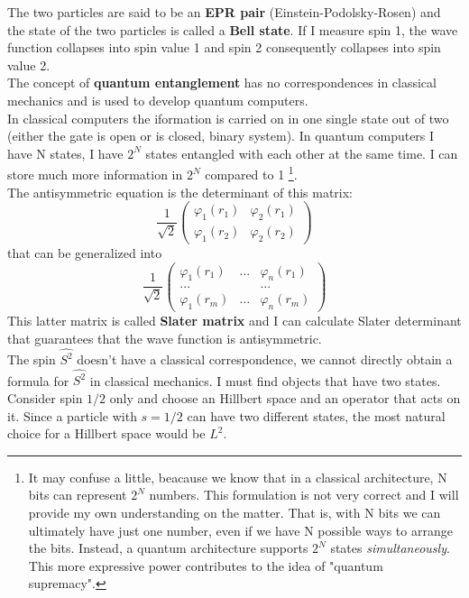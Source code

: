 The two particles are said to be an \textbf{EPR pair} (Einstein-Podolsky-Rosen) and the state of the two particles is called a \textbf{Bell state}.
If I measure spin 1, the wave function collapses into spin value 1 and spin 2 consequently collapses into spin value 2.\\
The concept of \textbf{quantum entanglement} has no correspondences in classical mechanics and is used to develop quantum computers.\\
In classical computers the iformation is carried on in one single state out of two (either the gate is open or is closed, binary system). In quantum computers I have N states, I have $2^N$ states entangled with each other at the same time. I can store much more information in $2^N$ compared to 1 \footnote{It may confuse a little, beacause we know that in a classical architecture, N bits can represent $2^N$ numbers. This formulation is not very correct and I will provide my own understanding on the matter. That is, with N bits we can ultimately have just one number, even if we have N possible ways to arrange the bits. Instead, a quantum architecture supports $2^N$ states \textit{simultaneously}. This more expressive power contributes to the idea of "quantum supremacy".}. \\
\newline
The antisymmetric equation is the determinant of this matrix:
\[
\frac{1}{\sqrt{2}}
\begin{pmatrix}
\varphi_1(r_1)&\varphi_2(r_1)\\
\varphi_1(r_2)&\varphi_2(r_2)
\end{pmatrix}
\]
that can be generalized into
\[
\frac{1}{\sqrt{2}}
\begin{pmatrix}
\varphi_1(r_1)&...&\varphi_n(r_1)\\
... & &...\\
\varphi_1(r_m)&...&\varphi_n(r_m)
\end{pmatrix}
\]
This latter matrix is called \textbf{Slater matrix} and I can calculate Slater determinant that guarantees that the wave function is antisymmetric.\\
\newline
The spin $\hat{S^2}$ doesn't have a classical correspondence, we cannot directly obtain a formula for $\hat{S^2}$ in classical mechanics. I must find objects that have two states.\\
Consider spin $1/2$ only and choose an Hillbert space and an operator that acts on it. Since a particle with $s=1/2$ can have two different states, the most natural choice for a Hillbert space would be \emph{$L^2$}.\\
